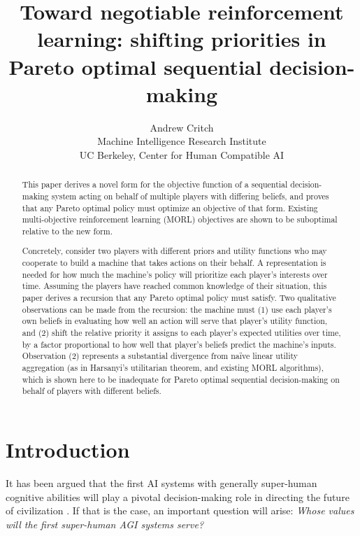 \documentclass{article}
\title{Toward negotiable reinforcement learning: shifting priorities in Pareto optimal sequential decision-making}
\author{Andrew Critch\\ Machine Intelligence Research Institute \\ UC Berkeley, Center for Human Compatible AI}
\begin{document}
\maketitle


\begin{abstract}
This paper derives a novel form for the objective function of a sequential decision-making system acting on behalf of multiple players with differing beliefs, and proves that any Pareto optimal policy must optimize an objective of that form.  Existing multi-objective reinforcement learning (MORL) objectives are shown to be suboptimal relative to the new form.

Concretely, consider two players with different priors and utility functions who may cooperate to build a machine that takes actions on their behalf.  A representation is needed for how much the machine's policy will prioritize each player's interests over time.  Assuming the players have reached common knowledge of their situation, this paper derives a recursion that any Pareto optimal policy must satisfy.  Two qualitative observations can be made from the recursion: the machine must (1) use each player's own beliefs in evaluating how well an action will serve that player's utility function, and (2) shift the relative priority it assigns to each player's expected utilities over time, by a factor proportional to how well that player's beliefs predict the machine's inputs.  Observation (2) represents a substantial divergence from na\"{i}ve linear utility aggregation (as in Harsanyi's utilitarian theorem, and existing MORL algorithms), which is shown here to be inadequate for Pareto optimal sequential decision-making on behalf of players with different beliefs.
\end{abstract}



\section{Introduction}

It has been argued that the first AI systems with generally super-human cognitive abilities will play a pivotal decision-making role in directing the future of civilization \citep{bostrom2014superintelligence}. If that is the case, an important question will arise: \emph{Whose values will the first super-human AGI systems serve?}
\end{document}
